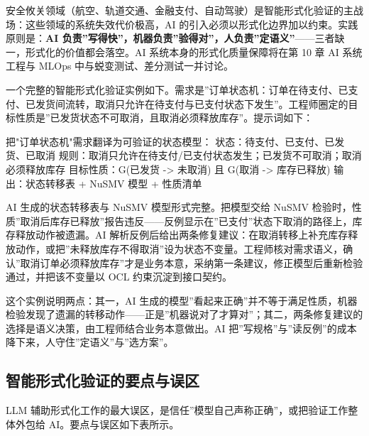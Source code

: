 \documentclass[12pt,a4paper,twoside,openany]{ctexbook}
\numberwithin{figure}{chapter}
\numberwithin{table}{chapter}
\newenvironment{Shaded}{}{}
\newcommand{\NormalTok}[1]{#1}
\begin{document}
安全攸关领域（航空、轨道交通、金融支付、自动驾驶）是智能形式化验证的主战场：这些领域的系统失效代价极高，AI
的引入必须以形式化边界加以约束。实践原则是：\textbf{AI
负责''写得快''，机器负责''验得对''，人负责''定语义''}------三者缺一，形式化的价值都会落空。AI
系统本身的形式化质量保障将在第 10 章 AI 系统工程与 MLOps
中与蜕变测试、差分测试一并讨论。

一个完整的智能形式化验证实例如下。需求是''订单状态机：订单在待支付、已支付、已发货间流转，取消只允许在待支付与已支付状态下发生''。工程师圈定的目标性质是''已发货状态不可取消，且取消必须释放库存''。提示词如下：

\begin{Shaded}
\begin{Highlighting}[]
\NormalTok{把"订单状态机"需求翻译为可验证的状态模型：}
\NormalTok{状态：待支付、已支付、已发货、已取消}
\NormalTok{规则：取消只允许在待支付/已支付状态发生；已发货不可取消；取消必须释放库存}
\NormalTok{目标性质：G(已发货 {-}\textgreater{} 未取消) 且 G(取消 {-}\textgreater{} 库存已释放)}
\NormalTok{输出：状态转移表 + NuSMV 模型 + 性质清单}
\end{Highlighting}
\end{Shaded}

AI 生成的状态转移表与 NuSMV 模型形式完整。把模型交给 NuSMV
检验时，性质''取消后库存已释放''报告违反------反例显示在''已支付''状态下取消的路径上，库存释放动作被遗漏。AI
解析反例后给出两条修复建议：在取消转移上补充库存释放动作，或把''未释放库存不得取消''设为状态不变量。工程师核对需求语义，确认''取消订单必须释放库存''才是业务本意，采纳第一条建议，修正模型后重新检验通过，并把该不变量以
OCL 约束沉淀到接口契约。

这个实例说明两点：其一，AI
生成的模型''看起来正确''并不等于满足性质，机器检验发现了遗漏的转移动作------正是''机器说对了才算对''；其二，两条修复建议的选择是语义决策，由工程师结合业务本意做出。AI
把''写规格''与''读反例''的成本降下来，人守住''定语义''与''选方案''。

\subsection{智能形式化验证的要点与误区}\label{ux667aux80fdux5f62ux5f0fux5316ux9a8cux8bc1ux7684ux8981ux70b9ux4e0eux8befux533a}

LLM
辅助形式化工作的最大误区，是信任''模型自己声称正确''，或把验证工作整体外包给
AI。要点与误区如下表所示。
\end{document}
